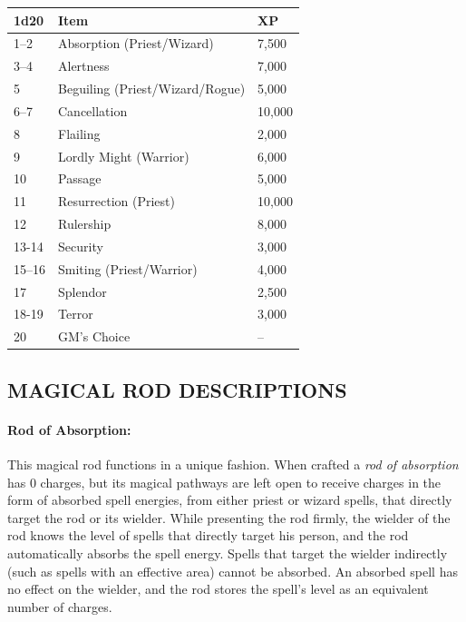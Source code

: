 \begin{multicols}{2}
\begin{minipage}{\columnwidth}
\label{rods}
\noindent
\begin{tabular}{|p{}|p{}|p{}|}
\hline
1d20	& Item	& XP \\
\hline\hline
\rowcolor[gray]{.9}1--2	& Absorption (Priest/Wizard)	& 7,500 \\
3--4	& Alertness	& 7,000 \\
\rowcolor[gray]{.9}5	& Beguiling (Priest/Wizard/Rogue)	& 5,000 \\
6--7	& Cancellation	& 10,000 \\
\rowcolor[gray]{.9}8	& Flailing	& 2,000 \\
9	& Lordly Might (Warrior)	& 6,000 \\
\rowcolor[gray]{.9}10	& Passage	& 5,000 \\
11	& Resurrection (Priest)	& 10,000 \\
\rowcolor[gray]{.9}12	& Rulership	& 8,000 \\
13-14	& Security	& 3,000 \\
\rowcolor[gray]{.9}15--16	& Smiting (Priest/Warrior)	& 4,000 \\
17	& Splendor	& 2,500 \\
\rowcolor[gray]{.9}18-19	& Terror	& 3,000 \\
20	& GM's Choice	& -- \\
\hline
\end{tabular}

\end{minipage}

\subsection{MAGICAL ROD DESCRIPTIONS}

\paragraph{Rod of Absorption:} This magical rod functions in a unique fashion. When crafted a \textit{rod of absorption} has 0 charges, but its magical pathways are left open to receive charges in the form of absorbed spell energies, from either priest or wizard spells, that directly target the rod or its wielder.  While presenting the rod firmly, the wielder of the rod knows the level of spells that directly target his person, and the rod automatically absorbs the spell energy.  Spells that target the wielder indirectly (such as spells with an effective area) cannot be absorbed.  An absorbed spell has no effect on the wielder, and the rod stores the spell's level as an equivalent number of charges.  


\end{multicols}

